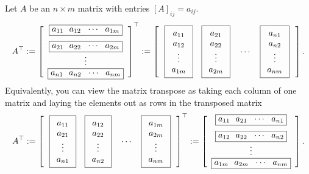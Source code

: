 \documentclass[letterpaper]{book}
\begin{document}
\begin{tcolorbox}[title=\textbf{\Large Transpose of a Matrix}]
Let $A$ be an $n \times m$ matrix with entries $[A]_{ij}=a_{ij}$. \\


$$
A^\top := \left[\begin{array}{c}\boxed{a_{11}~~ a_{12}~~ \cdots~~ a_{1m}} \medskip \\
\boxed{a_{21}~~ a_{22}~~ \cdots~~ a_{2m}} \\
\vdots \\
\boxed{a_{n1}~~ a_{n2}~~ \cdots~~ a_{nm}}\end{array}\right]^{\Huge \top} :=  \left[~~ \boxed{\begin{array}{c} a_{11} \\ a_{12}\\ \vdots \\ a_{1m}\end{array} }~~~
\boxed{\begin{array}{c} a_{21} \\ a_{22}\\ \vdots \\ a_{2m}\end{array} }~~~\cdots~~~
\boxed{\begin{array}{c} a_{n1} \\ a_{n2}\\ \vdots \\ a_{nm}\end{array}}~~\right].
$$
Equivalently, you can view the matrix transpose as taking each column of one matrix and laying the elements out as rows in the transposed matrix 
$$
 A^\top :=\left[ ~~\boxed{\begin{array}{c} a_{11} \\ a_{21}\\ \vdots \\ a_{n1}\end{array} }~~~
\boxed{\begin{array}{c} a_{12} \\ a_{22}\\ \vdots \\ a_{n2}\end{array} }~~~\cdots~~~
\boxed{\begin{array}{c} a_{1m} \\ a_{2m}\\ \vdots \\ a_{nm}\end{array} }~~\right]^{\Huge \top}:=  \left[\begin{array}{c}\boxed{a_{11}~~ a_{21}~~ \cdots~~ a_{n1}} \medskip \\
\boxed{a_{12}~~ a_{22}~~ \cdots~~ a_{n2}} \\
\vdots \\
\boxed{a_{1m}~~ a_{2m}~~ \cdots~~ a_{nm}}\end{array}\right] .
$$
\end{tcolorbox} 
\end{document}
